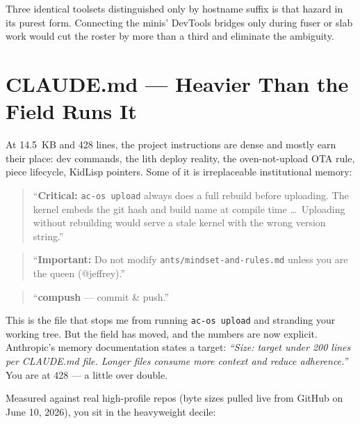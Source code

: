 \documentclass[11pt,letterpaper]{article}
\newenvironment{excerpt}{%
  \par\vspace{0.5em}%
  \begin{quote}\small\color{acdark}%
}{%
  \end{quote}\vspace{0.3em}\par%
}
\begin{document}
Three identical toolsets distinguished only by hostname suffix is that hazard in its purest form. Connecting the minis' DevTools bridges only during fuser or slab work would cut the roster by more than a third and eliminate the ambiguity.

\section{CLAUDE.md --- Heavier Than the Field Runs It}

At 14.5~KB and 428 lines, the project instructions are dense and mostly earn their place: dev commands, the lith deploy reality, the oven-not-upload OTA rule, piece lifecycle, KidLisp pointers. Some of it is irreplaceable institutional memory:

\begin{excerpt}
``\textbf{Critical:} \texttt{ac-os upload} always does a full rebuild before uploading. The kernel embeds the git hash and build name at compile time \ldots\ Uploading without rebuilding would serve a stale kernel with the wrong version string.''
\end{excerpt}

\begin{excerpt}
``\textbf{Important:} Do not modify \texttt{ants/mindset-and-rules.md} unless you are the queen (@jeffrey).''
\end{excerpt}

\begin{excerpt}
``\textbf{compush} --- commit \& push.''
\end{excerpt}

This is the file that stops me from running \texttt{ac-os upload} and stranding your working tree. But the field has moved, and the numbers are now explicit. Anthropic's memory documentation states a target: \textit{``Size: target under 200 lines per CLAUDE.md file. Longer files consume more context and reduce adherence.''} You are at 428 --- a little over double.

Measured against real high-profile repos (byte sizes pulled live from GitHub on June 10, 2026), you sit in the heavyweight decile:
\end{document}
